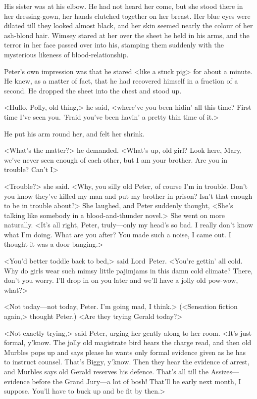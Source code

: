 His sister was at his elbow. He had not heard her come, but she stood there in her dressing-gown, her hands clutched together on her breast.  Her blue eyes were dilated till they looked almost black, and her skin seemed nearly the colour of her ash-blond hair. Wimsey stared at her over the sheet he held in his arms, and the terror in her face passed over into his, stamping them suddenly with the mysterious likeness of blood-relationship.

Peter's own impression was that he stared <like a stuck pig> for about a minute. He knew, as a matter of fact, that he had recovered himself in a fraction of a second. He dropped the sheet into the chest and stood up.

<Hullo, Polly, old thing,> he said, <where've you been hidin' all this time? First time I've seen you. 'Fraid you've been havin' a pretty thin time of it.>

He put his arm round her, and felt her shrink.

<What's the matter?> he demanded. <What's up, old girl? Look here, Mary, we've never seen enough of each other, but I am your brother. Are you in trouble? Can't I\longdash>

<Trouble?> she said. <Why, you silly old Peter, of course I'm in trouble. Don't you know they've killed my man and put my brother in prison? Isn't that enough to be in trouble about?> She laughed, and Peter suddenly thought, <She's talking like somebody in a blood-and-thunder novel.> She went on more naturally. <It's all right, Peter, truly—only my head's so bad. I really don't know what I'm doing. What are you after? You made such a noise, I came out. I thought it was a door banging.>

<You'd better toddle back to bed,> said Lord~Peter. <You're gettin' all cold. Why do girls wear such mimsy little pajimjams in this damn cold climate? There, don't you worry. I'll drop in on you later and we'll have a jolly old pow-wow, what?>

<Not today—not today, Peter. I'm going mad, I think.> (<Sensation fiction again,> thought Peter.) <Are they trying Gerald today?>

<Not exactly trying,> said Peter, urging her gently along to her room.  <It's just formal, y'know. The jolly old magistrate bird hears the charge read, and then old Murbles pops up and says please he wants only formal evidence given as he has to instruct counsel. That's Biggy, y'know. Then they hear the evidence of arrest, and Murbles says old Gerald reserves his defence. That's all till the Assizes—evidence before the Grand Jury—a lot of bosh! That'll be early next month, I suppose. You'll have to buck up and be fit by then.>

